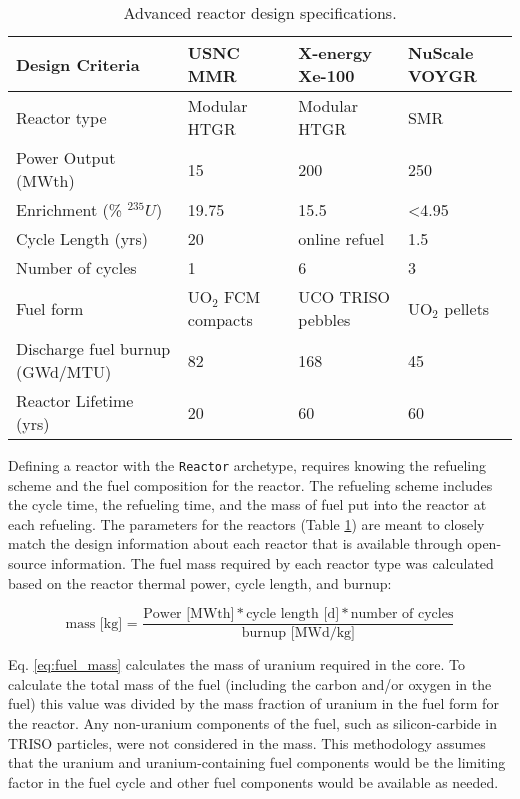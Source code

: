 \begin{table}[ht]
    \centering
    \caption{Advanced reactor design specifications.}
    \label{tab:reactor_summary}
    \renewcommand{\arraystretch}{1.5}
    \begin{tabular}{p{3.5cm}p{3cm}p{3cm}p{3cm}}
        \hline
        Design Criteria & \gls{USNC} \gls{MMR} \cite{noauthor_usnc_2021} & 
        X-energy Xe-100 \cite{mulder_overview_2021} & NuScale VOYGR 
        \cite{nuscale_chapter_2020-1,reyes_nuscale_2021,reyes_correction_2022}\\
        \hline
        Reactor type & Modular HTGR & Modular HTGR & SMR\\
        Power Output (MWth) & 15 & 200  & 250 \\
        Enrichment (\% $^{235}U$) & 19.75 & 15.5 & <4.95 \\
        Cycle Length (yrs) & 20 & online refuel & 1.5\\
        Number of cycles & 1 & 6 & 3\\
        Fuel form & UO$_2$ \gls{FCM} compacts & UCO \gls{TRISO} pebbles & UO$_2$ pellets\\
        Discharge fuel burnup (GWd/MTU) & 82 & 168  & 45 \\
        Reactor Lifetime (yrs)& 20 & 60 & 60 \\
        \hline
    \end{tabular}
\end{table}

Defining a reactor with the \Cycamore \texttt{Reactor} archetype, 
requires knowing the refueling scheme and the fuel composition for 
the reactor. The refueling scheme includes 
the cycle time, the refueling time, and the mass of fuel put into the reactor 
at each refueling. The parameters for the reactors (Table \ref{tab:reactor_summary})
are meant to closely match the design information about each reactor that 
is available through open-source information. The fuel mass required by 
each reactor type was calculated based on the reactor thermal power, 
cycle length, and burnup:

\begin{equation}
    \text{mass [kg] = }\frac{\text{Power [MWth]}* \text{cycle 
    length [d]} * \text{number of cycles}}{\text{burnup [MWd/kg]}}
    \label{eq:fuel_mass}
\end{equation}

\noindent Eq. \ref{eq:fuel_mass} calculates the mass of uranium required 
in the core. To calculate the total mass of the fuel (including the carbon 
and/or oxygen in the fuel) this value was divided by the mass fraction of 
uranium in the fuel form for the reactor. Any non-uranium components 
of the fuel, such as silicon-carbide in \gls{TRISO} particles, were 
not considered in the mass. This methodology assumes that the 
uranium and uranium-containing fuel components would be the limiting 
factor in the fuel cycle and other fuel components would be available as 
needed. 

